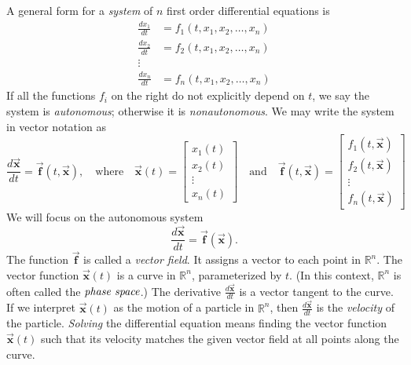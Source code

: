 \documentclass[reqno]{immbook}
\newcommand{\BF}{\vec{\textbf{f}}}
\newcommand{\BX}{\vec{\textbf{x}}}
\numberwithin{equation}{chapter}
\numberwithin{question}{section}
\numberwithin{theorem}{chapter}
\numberwithin{figure}{chapter}
\theoremstyle{definition}
\begin{document}
A general form for a \emph{system} of $n$ first order differential
equations is
\begin{equation}
\begin{split}
  \frac{dx_1}{dt} & = f_1(t,x_1,x_2,\ldots,x_n) \\
  \frac{dx_2}{dt} & = f_2(t,x_1,x_2,\ldots,x_n) \\
  \vdots \\
  \frac{dx_n}{dt} & = f_n(t,x_1,x_2,\ldots,x_n)
\end{split}
\end{equation}
If all the functions $f_i$ on the right do not explicitly depend on
$t$, we say the system is \emph{autonomous}; otherwise it is
\emph{nonautonomous}.
We may write the system in vector notation as
\begin{equation}
   \frac{d\BX}{dt} = \BF(t,\BX),
      \quad
      \textrm{where}
      \quad
      \BX(t) = \begin{bmatrix} x_1(t) \\ x_2(t) \\ \vdots \\ x_n(t)\end{bmatrix}
      \quad
      \textrm{and}
      \quad
      \BF(t,\BX) = \begin{bmatrix} f_1(t,\BX) \\ f_2(t,\BX) \\ \vdots \\ f_n(t,\BX) \end{bmatrix}
\end{equation}
We will focus on the autonomous system
\begin{equation}
   \frac{d\BX}{dt} = \BF(\BX).
\end{equation}
The function $\BF$ is called a \emph{vector field}.
It assigns a vector to each point in $\mathbb{R}^n$.
The vector function $\BX(t)$ is a curve in $\mathbb{R}^n$,
parameterized by $t$.
(In this context, $\mathbb{R}^n$ is often called
the $\emph{phase space}$.)
The derivative $\frac{d\BX}{dt}$ is a vector tangent to
the curve.
If we interpret $\BX(t)$ as the motion of a particle
in $\mathbb{R}^n$, then $\frac{d\BX}{dt}$ is the \emph{velocity}
of the particle.
\emph{Solving} the differential equation means finding
the vector function
$\BX(t)$ such that its velocity matches the given vector field
at all points along the curve.
\end{document}
